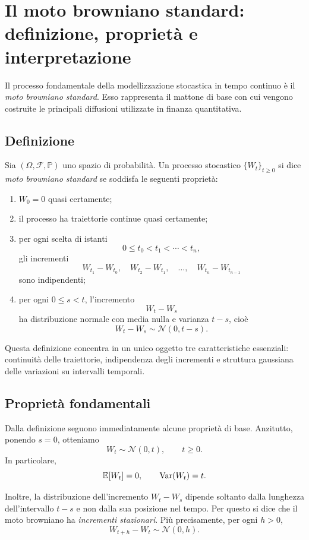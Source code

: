 \section{Il moto browniano standard: definizione, propriet\`{a} e interpretazione}
\label{sec:browniano}

Il processo fondamentale della modellizzazione stocastica in tempo
continuo \`{e} il \emph{moto browniano standard}. Esso rappresenta il
mattone di base con cui vengono costruite le principali diffusioni
utilizzate in finanza quantitativa.

\subsection*{Definizione}

Sia $(\Omega,\mathcal{F},\mathbb{P})$ uno spazio di probabilit\`{a}. Un
processo stocastico $\{W_t\}_{t\geq 0}$ si dice \emph{moto browniano
standard} se soddisfa le seguenti propriet\`{a}:
\begin{enumerate}
    \item $W_0=0$ quasi certamente;
    \item il processo ha traiettorie continue quasi certamente;
    \item per ogni scelta di istanti
    \[
    0\leq t_0 < t_1 < \cdots < t_n,
    \]
    gli incrementi
    \[
    W_{t_1}-W_{t_0}, \quad W_{t_2}-W_{t_1}, \quad \ldots, \quad
    W_{t_n}-W_{t_{n-1}}
    \]
    sono indipendenti;
    \item per ogni $0\leq s<t$, l'incremento
    \[
    W_t-W_s
    \]
    ha distribuzione normale con media nulla e varianza $t-s$, cio\`{e}
    \[
    W_t-W_s \sim \mathcal{N}(0,t-s).
    \]
\end{enumerate}

Questa definizione concentra in un unico oggetto tre caratteristiche
essenziali: continuit\`{a} delle traiettorie, indipendenza degli
incrementi e struttura gaussiana delle variazioni su intervalli
temporali.

\subsection*{Propriet\`{a} fondamentali}

Dalla definizione seguono immediatamente alcune propriet\`{a} di base.
Anzitutto, ponendo $s=0$, otteniamo
\[
W_t \sim \mathcal{N}(0,t), \qquad t\geq 0.
\]
In particolare,
\[
\mathbb{E}[W_t]=0,
\qquad
\operatorname{Var}(W_t)=t.
\]

Inoltre, la distribuzione dell'incremento $W_t-W_s$ dipende soltanto
dalla lunghezza dell'intervallo $t-s$ e non dalla sua posizione nel
tempo. Per questo si dice che il moto browniano ha \emph{incrementi
stazionari}. Pi\`{u} precisamente, per ogni $h>0$,
\[
W_{t+h}-W_t \sim \mathcal{N}(0,h).
\]

